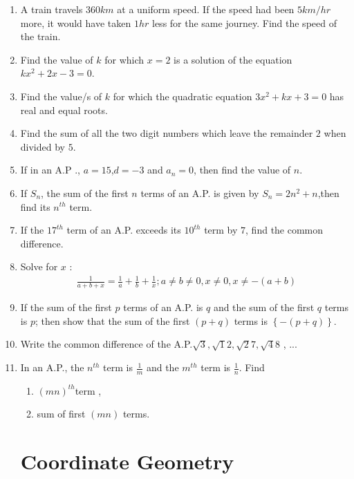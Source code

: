 \documentclass[2pt,-letter paper]{article}
\providecommand{\cbrak}[1]{\ensuremath{\left\{#1\right\}}}
\providecommand{\brak}[1]{\ensuremath{\left(#1\right)}}
\begin{document}
\begin{enumerate}
\item A train travels $360 km$ at a uniform speed. If the speed had been $5 km/hr$ more, it would have taken $1 hr$ less for the same journey. Find the speed of the train.

\item Find the value of $k$ for which $x = 2$ is a solution of the equation
  $kx^2 + 2x - 3 = 0$.
  
\item Find the value/s of $k$ for which the quadratic equation $3x^{2} + kx + 3 = 0$
has real and equal roots.

\item Find the sum of all the two digit numbers which leave the remainder $2$ when divided by $5$.

\item If in an A.P ., $a=15$,$d=-3$ and $a_n=0$, then find the value of $n$.

\item If ${S_n}$, the sum of the first ${n}$ terms of an A.P. is given by ${S_n = 2n^2 + n}$,then find its $n^{th}$ term. 

\item If the $17^{th}$ term of an A.P. exceeds its $10^{th}$ term by $7$, find the common difference.

\item Solve for $x$ :
\begin{align*}
    {\frac {1}{a+b+x}} = {\frac{1}{a}} + {\frac{1}{b}} + {\frac{1}{x}};  {a\neq b \neq 0},{x \neq 0},{x \neq -(a+b)}
\end{align*}

\item If the sum of the first $p$ terms of an A.P. is $q$ and the sum of the first $q$ terms is $p$; then show that the sum of the first $\brak{p + q}$ terms is $\cbrak {-\brak {p + q}}$.

\item Write the common difference of the A.P.${\sqrt3} , {\sqrt12} , {\sqrt27} , {\sqrt48}$ , ... 
\item In an A.P., the $n^{th}$ term is ${\frac{1}{m}}$ and the $m^{th}$ term is $\frac{1}{n}$. Find \begin{enumerate}
     \item  $\brak{mn}^{th}$term  ,
     \item sum of first $\brak{mn}$ terms.
\end{enumerate}

\section{Coordinate Geometry}


\end{enumerate}
\end{document}
